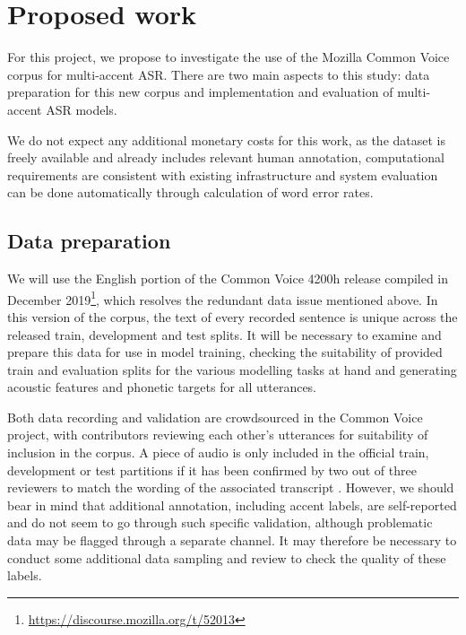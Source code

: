 \documentclass[a4paper]{article}
\begin{document}
\section{Proposed work}

For this project, we propose to investigate the use of the Mozilla Common Voice corpus for multi-accent ASR.
There are two main aspects to this study: data preparation for this new corpus and implementation and evaluation of multi-accent ASR models.

We do not expect any additional monetary costs for this work, as the dataset is freely available and already includes relevant human annotation, computational requirements are consistent with existing infrastructure and system evaluation can be done automatically through calculation of word error rates.

\subsection{Data preparation}

We will use the English portion of the Common Voice 4200h release compiled in December 2019\footnote{\url{https://discourse.mozilla.org/t/52013}}, which resolves the redundant data issue mentioned above.
In this version of the corpus, the text of every recorded sentence is unique across the released train, development and test splits.
It will be necessary to examine and prepare this data for use in model training, checking the suitability of provided train and evaluation splits for the various modelling tasks at hand and generating acoustic features and phonetic targets for all utterances.

Both data recording and validation are crowdsourced in the Common Voice project, with contributors reviewing each other's utterances for suitability of inclusion in the corpus.
A piece of audio is only included in the official train, development or test partitions if it has been confirmed by two out of three reviewers to match the wording of the associated transcript \cite{ardila2019CommonVoiceMassivelyMultilingual}.
However, we should bear in mind that additional annotation, including accent labels, are self-reported and do not seem to go through such specific validation, although problematic data may be flagged through a separate channel.
It may therefore be necessary to conduct some additional data sampling and review to check the quality of these labels.
\end{document}
